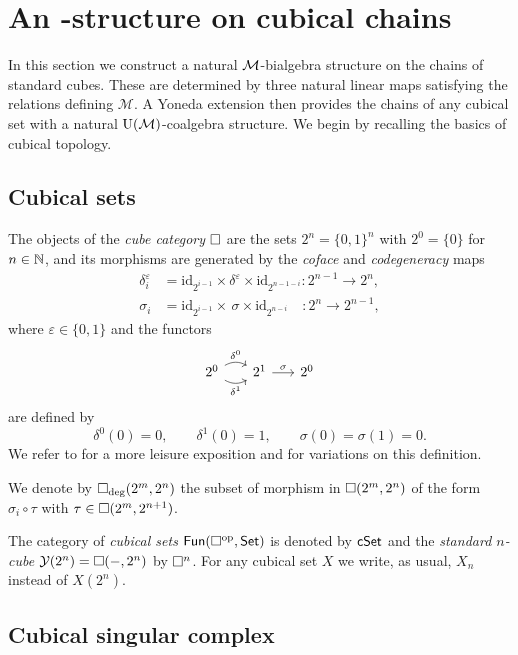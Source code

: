 
\section{An \pdfEinfty-structure on cubical chains} \label{s:action}

In this section we construct a natural $\mathcal{M}$-bialgebra structure on the chains of standard cubes.
These are determined by three natural linear maps satisfying the relations defining $\mathcal M$.
A Yoneda extension then provides the chains of any cubical set with a natural ${\operatorname{U}(\mathcal{M})}$-coalgebra structure.
We begin by recalling the basics of cubical topology.

\subsection{Cubical sets}

The objects of the \textit{cube category} $\square$ are the sets $2^n = \{0, 1\}^n$ with $2^0 = \{0\}$ for $n \in \mathbb{N}$, and its morphisms are generated by the \textit{coface} and \textit{codegeneracy} maps
\begin{align*}
\delta_i^\varepsilon & = \mathrm{id}_{2^{i-1}} \times \delta^\varepsilon \times \mathrm{id}_{2^{n-1-i}} \colon 2^{n-1} \to 2^n, \\
\sigma_i & = \mathrm{id}_{2^{i-1}} \times \, \sigma \times \mathrm{id}_{2^{n-i}} \quad \colon 2^{n} \to 2^{n-1},
\end{align*}
where $\varepsilon \in \{0,1\}$ and the functors
\[
\begin{tikzcd} [column sep=16pt]
2^0 \arrow[r, bend left, "\delta^0"] \arrow[r, bend right, "\delta^1"'] & 2^1 \arrow[r, "\sigma"] & 2^0
\end{tikzcd}
\]
are defined by
\[
\delta^0(0) = 0, \qquad \delta^1(0) = 1, \qquad \sigma(0) = \sigma(1) = 0.
\]
We refer to \cite{grandis2003cubical} for a more leisure exposition and for variations on this definition.

We denote by $\square_{\deg}(2^m, 2^n)$ the subset of morphism in $\square(2^m, 2^n)$ of the form $\sigma_i \circ \tau$ with $\tau \in \square(2^m, 2^{n+1})$.

The category of \textit{cubical sets} $\mathsf{Fun}(\square^{\mathrm{op}}, \mathsf{Set})$ is denoted by $\mathsf{cSet}$ and
the \textit{standard $n$-cube} $\operatorname{\mathcal{Y}}(2^n) = \square(-, 2^n)$ by $\square^n$.
For any cubical set $X$ we write, as usual, $X_n$ instead of $X(2^n)$.

\subsection{Cubical singular complex}

